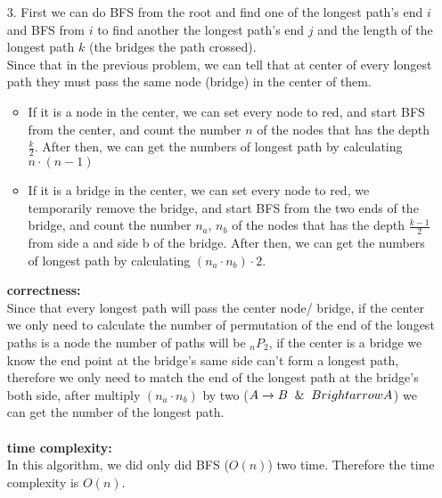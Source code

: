 \documentclass{homework}
\begin{document}
\begin{itemize}
    \item[3.]
        First we can do BFS from the root and find one of the longest path's end $i$ and BFS from $i$ to find another the longest path's end $j$ and the length of the longest path $k$ (the bridges the path crossed).\\
        Since that in the previous problem, we can tell that at center of every longest path they must pass the same node (bridge) in the center of them.\\
        \begin{itemize}
            \item If it is a node in the center, we can set every node to red, and start BFS from the center, and count the number $n$ of the nodes that has the depth $\frac{k}{2}$. After then, we can get the numbers of longest path by calculating $n\cdot(n-1)$
            \item If it is a bridge in the center, we can set every node to red, we temporarily remove the bridge, and start BFS from the two ends of the bridge, and count the number $n_a$, $n_b$ of the nodes that has the depth $\frac{k-1}{2}$ from side a and side b of the bridge. After then, we can get the numbers of longest path by calculating $(n_a \cdot n_b) \cdot 2$.
        \end{itemize}
        \textbf{correctness:}\\
        Since that every longest path will pass the center node/ bridge, if the center we only need to calculate the number of permutation of the end of the longest paths is a node the number of paths will be $_n P_2$, if the center is a bridge we know the end point at the bridge's same side can't form a longest path, therefore we only need to match the end of the longest path at the bridge's both side, after multiply $(n_a \cdot n_b)$ by two ($A\rightarrow B \And B\\rightarrow A$) we can get the number of the longest path. \\\\
        \textbf{time complexity:}\\
        In this algorithm, we did only did BFS ($O(n)$) two time. Therefore the time complexity is $O(n)$.\\
\clearpage
\end{itemize}
\end{document}
